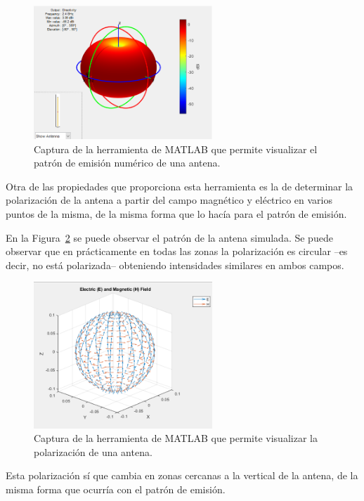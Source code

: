 \begin{figure}[H]
    \centering
    \includegraphics[width=0.6\textwidth]{pic/patron.png}
    \caption{Captura de la herramienta de MATLAB que permite visualizar el patrón de emisión numérico de una antena.}
    \label{fig:patron_matlab}
\end{figure}

Otra de las propiedades que proporciona esta herramienta es la de determinar la polarización de la antena a partir del campo magnético y eléctrico en varios puntos de la misma, de la misma forma que lo hacía para el patrón de emisión.

En la Figura~\ref{fig:eh_matlab} se puede observar el patrón de la antena simulada.
Se puede observar que en prácticamente en todas las zonas la polarización es circular --es decir, no está polarizada-- obteniendo intensidades similares en ambos campos.

\begin{figure}[H]
    \centering
    \includegraphics[width=0.6\textwidth]{pic/eh.png}
    \caption{Captura de la herramienta de MATLAB que permite visualizar la polarización de una antena.}
    \label{fig:eh_matlab}
\end{figure}

Esta polarización sí que cambia en zonas cercanas a la vertical de la antena, de la misma forma que ocurría con el patrón de emisión.

